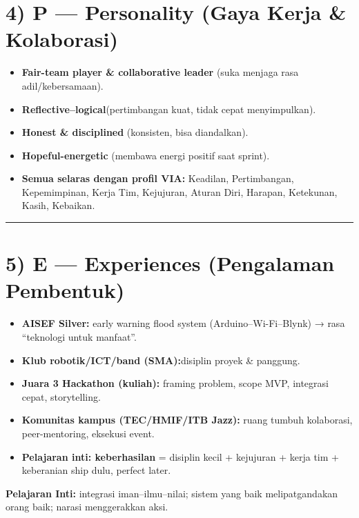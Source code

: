 \documentclass[
  letterpaper,
  DIV=11,
  numbers=noendperiod]{scrreprt}
\begin{document}
\section{4) P --- Personality (Gaya Kerja \&
Kolaborasi)}\label{p-personality-gaya-kerja-kolaborasi}

\begin{itemize}
\item
  \textbf{Fair-team player \& collaborative leader} (suka menjaga rasa
  adil/kebersamaan).
\item
  \textbf{Reflective--logical}(pertimbangan kuat, tidak cepat
  menyimpulkan).
\item
  \textbf{Honest \& disciplined} (konsisten, bisa diandalkan).
\item
  \textbf{Hopeful-energetic} (membawa energi positif saat sprint).
\item
  \textbf{Semua selaras dengan profil VIA:} Keadilan, Pertimbangan,
  Kepemimpinan, Kerja Tim, Kejujuran, Aturan Diri, Harapan, Ketekunan,
  Kasih, Kebaikan.
\end{itemize}

\begin{center}\rule{0.5\linewidth}{0.5pt}\end{center}

\section{5) E --- Experiences (Pengalaman
Pembentuk)}\label{e-experiences-pengalaman-pembentuk}

\begin{itemize}
\item
  \textbf{AISEF Silver:} early warning flood system
  (Arduino--Wi-Fi--Blynk) → rasa ``teknologi untuk manfaat''.
\item
  \textbf{Klub robotik/ICT/band (SMA):}disiplin proyek \& panggung.
\item
  \textbf{Juara 3 Hackathon (kuliah):} framing problem, scope MVP,
  integrasi cepat, storytelling.
\item
  \textbf{Komunitas kampus (TEC/HMIF/ITB Jazz):} ruang tumbuh
  kolaborasi, peer-mentoring, eksekusi event.
\item
  \textbf{Pelajaran inti: keberhasilan} = disiplin kecil + kejujuran +
  kerja tim + keberanian ship dulu, perfect later.
\end{itemize}

\textbf{Pelajaran Inti:} integrasi iman--ilmu--nilai; sistem yang baik
melipatgandakan orang baik; narasi menggerakkan aksi.
\end{document}
